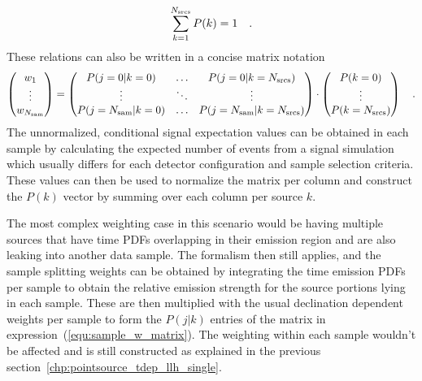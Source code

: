 \begin{equation}
  \sum_{k=1}^{N_\text{srcs}} P(k) = 1
  \quad\text{.}
\end{equation}
These relations can also be written in a concise matrix notation
\begin{equation}
  \label{equ:sample_w_matrix}
  \begin{pmatrix} w_1 \\ \vdots \\ w_{N_\text{sam}} \end{pmatrix} =
    \begin{pmatrix}
      P(j=0|k=0) & \dots & P(j=0|k=N_\text{srcs}) \\
      \vdots & \ddots & \vdots \\
      P(j=N_\text{sam}|k=0) & \dots & P(j=N_\text{sam}|k=N_\text{srcs})
    \end{pmatrix} \cdot
    \begin{pmatrix}
      P(k=0) \\ \vdots \\ P(k=N_\text{srcs})
    \end{pmatrix}
  \quad\text{.}
\end{equation}
The unnormalized, conditional signal expectation values can be obtained in each sample by calculating the expected number of events from a signal simulation which usually differs for each detector configuration and sample selection criteria.
These values can then be used to normalize the matrix per column and construct the $P(k)$ vector by summing over each column per source $k$.

The most complex weighting case in this scenario would be having multiple sources that have time PDFs overlapping in their emission region and are also leaking into another data sample.
The formalism then still applies, and the sample splitting weights can be obtained by integrating the time emission PDFs per sample to obtain the relative emission strength for the source portions lying in each sample.
These are then multiplied with the usual declination dependent weights per sample to form the $P(j|k)$ entries of the matrix in expression~(\ref{equ:sample_w_matrix}).
The weighting within each sample wouldn't be affected and is still constructed as explained in the previous section~\ref{chp:pointsource_tdep_llh_single}.

